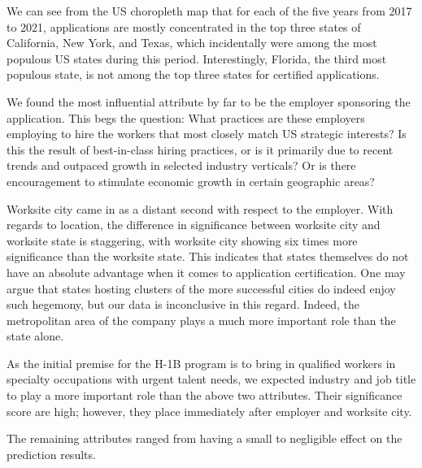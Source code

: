 \documentclass[sigconf]{acmart}
\begin{document}


We can see from the US choropleth map that for each of the five years 
from 2017 to 2021, 
applications are mostly 
concentrated in the top three states of California, 
New York, and Texas, which incidentally were among the most populous 
US states during this period. 
Interestingly, Florida, the third most populous state, is not among the 
top three states for 
certified applications. 


We found the most influential attribute by far to be the employer sponsoring 
the application. This begs the question: What practices are these employers employing 
to hire the workers that most closely match US strategic interests? 
Is this the result of best-in-class hiring practices, or is it primarily due to 
recent trends and outpaced growth in selected industry verticals? 
Or is there encouragement to stimulate economic growth in certain geographic areas? 


Worksite city came in as a distant second with respect to the employer. 
With regards to location, the difference in significance between worksite city 
and worksite state is staggering, with worksite city showing six times more significance 
than the worksite state. This indicates that states themselves do not have an absolute advantage 
when it comes to application certification. One may argue that states hosting clusters of 
the more successful cities do indeed enjoy such hegemony, but our data is inconclusive in this regard.
Indeed, the metropolitan area of the company plays a much more important role than the state alone. 


As the initial premise for the H-1B program is to bring in qualified workers in specialty 
occupations with urgent 
talent needs, we expected industry and job title to play a more important role than 
the above two attributes. Their significance 
score are high; however, they place immediately after employer and worksite city. 


The remaining attributes ranged from having a small to negligible effect on the prediction results. 
\end{document}
